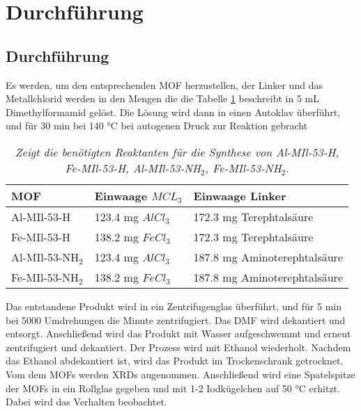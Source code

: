 \documentclass[12pt, a4paper]{article}
\begin{document}
\newpage
\renewcommand{\arraystretch}{1.3}
\section{Durchführung}
\subsection{Durchführung}
Es werden, um den entsprechenden MOF herzustellen, der Linker und das Metallchlorid werden in den Mengen die die Tabelle \ref{MOFmengen} beschreibt in 5 mL Dimethylformamid gelöst. 
Die Lösung wird dann in einen Autoklav überführt, und für 30 min bei 140 °C bei autogenen Druck zur Reaktion gebracht

\begin{table}[h!]
\caption{\textit{Zeigt die benötigten Reaktanten für die Synthese von Al-MIl-53-H, Fe-MIl-53-H, Al-MIl-53-NH$_2$, Fe-MIl-53-NH$_2$}.\cite{Skript}}
\begin{center}
\begin{tabular}{|p{4cm}|p{4cm}|p{6cm}|}
    \hline
    MOF & Einwaage $MCL_3$ & Einwaage Linker \\
    \hline
    Al-MIl-53-H & 123.4 mg $AlCl_3$ & 172.3 mg Terephtalsäure \\
    \hline
    Fe-MIl-53-H & 138.2 mg $FeCl_3$ & 172.3 mg Terephtalsäure\\
    \hline
    Al-MIl-53-NH$_2$ & 123.4 mg $AlCl_3$ & 187.8 mg Aminoterephtalsäure\\
    \hline
    Fe-MIl-53-NH$_2$ & 138.2 mg $FeCl_3$ & 187.8 mg Aminoterephtalsäure\\
    \hline

\end{tabular}

\end{center}
{
Das entstandene Produkt wird in ein Zentrifugenglas überführt, und für 5 min bei 5000 
Umdrehungen die Minute zentrifugiert. Das DMF wird dekantiert und entsorgt. 
Anschließend wird das Produkt mit Wasser 
aufgeschwemmt und erneut zentrifugiert und dekantiert. 
Der Prozess wird mit Ethanol wiederholt. Nachdem das Ethanol abdekantiert ist, wird das Produkt im Trockenschrank getrocknet.\cite{Skript}
\vspace{0.2cm}}\\
{
Vom dem MOFs werden XRDs augenommen. Anschließend wird eine Spatelspitze der MOFs in ein Rollglas gegeben und mit 1-2 Iodkügelchen auf 50 °C 
erhitzt. Dabei wird das Verhalten beobachtet.
}






\label{MOFmengen}

\end{table}
\end{document}
